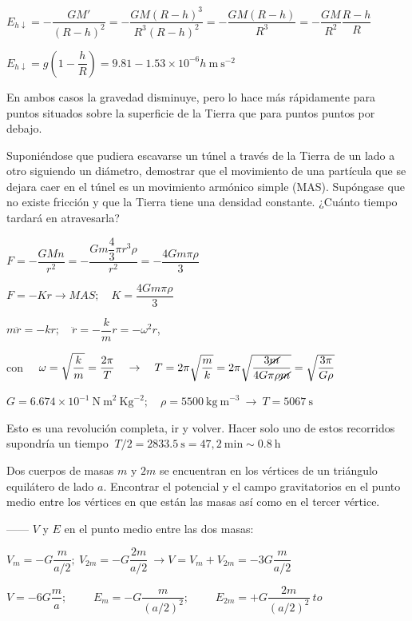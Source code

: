 $E_{h\downarrow}=-\dfrac{GM'}{(R-h)^2}=-\dfrac{GM(R-h)^3}{R^3(R-h)^2}=-\dfrac{GM(R-h)}{R^3}=-\dfrac{GM}{R^2} \dfrac{R-h}{R}$

$E_{h\downarrow}=g\left( 1-\dfrac h R \right) =9.81-1.53\times 10^{-6}h\ \mathrm{m\ s}^{-2}$

En ambos casos la gravedad disminuye, pero lo hace más rápidamente para puntos situados sobre la superficie de la Tierra que para puntos puntos por debajo.




\begin{prob}
 Suponiéndose que pudiera escavarse un túnel a través de la Tierra de un lado a otro siguiendo un diámetro, demostrar que el movimiento de una partícula que se dejara caer en el túnel es un movimiento armónico simple (MAS). Supóngase que no existe fricción y que la Tierra tiene una densidad constante. ¿Cuánto tiempo tardará en atravesarla?
\end{prob}

$F=-\dfrac{GMn}{r^2}=-\dfrac{Gm\dfrac 4 3 \pi r^3 \rho}{r^2}=-\dfrac{4Gm\pi \rho}{3}$

$F=-Kr \to MAS;\quad K=\dfrac{4Gm\pi \rho}{3}$

$m \ddot{r}=-kr;\quad \ddot{r}=-\dfrac k m r=-\omega^2 r$, 

con $\quad \omega=\sqrt{\dfrac k m}=\dfrac{2\pi}{T} \quad \to \quad T=2\pi\sqrt{\dfrac m k}=2\pi \sqrt{\dfrac{3 \cancel{m}}{4G\pi \rho \cancel{m}}}=\sqrt{\dfrac{3 \pi}{G \rho}}$
 
$G=6.674\times 10^{-1} \ \mathrm{N\ m}^2 \ \mathrm{Kg}^{-2}; \quad \rho=5500 \ \mathrm{kg\ m}^{-3} \ \to \ T=5067\ \mathrm{s}$

Esto es una revolución completa, ir y volver. Hacer solo uno de estos recorridos supondría un tiempo $\ T/2=2833.5\ \mathrm{s} =47,2\ \mathrm{min}\sim 0.8 \ \mathrm{h}$


\begin{prob}
	Dos cuerpos de masas $m$ y $2m$ se encuentran en los vértices de un triángulo equilátero de lado $a$. Encontrar el potencial y el campo gravitatorios en el punto medio entre los vértices en que están las masas así como en el tercer vértice.
\end{prob}


------ $V$ y $E$ en el punto medio entre las dos masas:

$V_m=-G\dfrac{m}{a/2}; \ V_{2m}=-G\dfrac{2m}{a/2} \ \to V=V_m+V_{2m}=-3G\dfrac{m}{a/2}$

$V=-6G\dfrac m a;$
$\qquad E_m=-G\dfrac{m}{(a/2)^2}; $
$\qquad E_{2m}=+G\dfrac{2m}{(a/2)^2} \ to $

